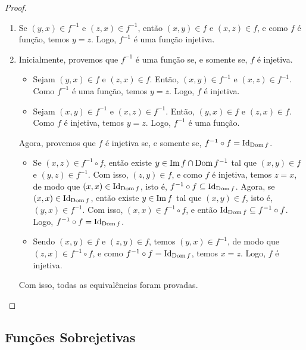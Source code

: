 \begin{proof}
    \leavevmode
        \begin{enumerate}[leftmargin=*, align=left, label=\textbf{(\alph*)}]
            \item Se $(y,x) \in f^{-1}$ e $(z,x) \in f^{-1}$, então $(x,y) \in f$ e $(x,z) \in f$, e como $f$ é função, temos $y=z$. Logo, $f^{-1}$ é uma função injetiva. \blackproof
            \item Inicialmente, provemos que $f^{-1}$ é uma função se, e somente se, $f$ é injetiva.
                \begin{itemize}
                    \item[($\Rightarrow$)] Sejam $(y,x) \in f$ e $(z,x) \in f$. Então, $(x,y) \in f^{-1}$ e $(x,z) \in f^{-1}$. Como $f^{-1}$ é uma função, temos $y=z$. Logo, $f$ é injetiva.
                    \item[($\Leftarrow$)] Sejam $(x,y) \in f^{-1}$ e $(x,z) \in f^{-1}$. Então, $(y,x) \in f$ e $(z,x) \in f$. Como $f$ é injetiva, temos $y=z$. Logo, $f^{-1}$ é uma função.
                \end{itemize}
            Agora, provemos que $f$ é injetiva se, e somente se, $f^{-1} \circ f = \operatorname{Id}_{\operatorname{Dom} f}$.
                \begin{itemize}
                    \item[($\Rightarrow$)] Se $(x,z) \in f^{-1} \circ f$, então existe $y \in \operatorname{Im} f \cap \operatorname{Dom} f^{-1}$ tal que $(x,y) \in f$ e $(y,z) \in f^{-1}$. Com isso, $(z,y) \in f$, e como $f$ é injetiva, temos $z=x$, de modo que $(x,x) \in \operatorname{Id}_{\operatorname{Dom} f}$, isto é, $f^{-1} \circ f \subseteq \operatorname{Id}_{\operatorname{Dom} f}$. Agora, se $(x,x) \in \operatorname{Id}_{\operatorname{Dom} f}$, então existe $y \in \operatorname{Im} f$ tal que $(x, y) \in f$, isto é, $(y,x) \in f^{-1}$. Com isso, $(x,x) \in f^{-1} \circ f$, e então $\operatorname{Id}_{\operatorname{Dom} f} \subseteq f^{-1} \circ f$. Logo, $f^{-1} \circ f = \operatorname{Id}_{\operatorname{Dom} f}$.
                    \item[($\Leftarrow$)] Sendo $(x,y) \in f$ e $(z,y) \in f$, temos $(y,x) \in f^{-1}$, de modo que $(z,x) \in f^{-1} \circ f$, e como $f^{-1} \circ f = \operatorname{Id}_{\operatorname{Dom} f}$, temos $x=z$. Logo, $f$ é injetiva.
                \end{itemize}
            Com isso, todas as equivalências foram provadas. \blackproof
        \end{enumerate}
\end{proof}

\subsection{Funções Sobrejetivas}

